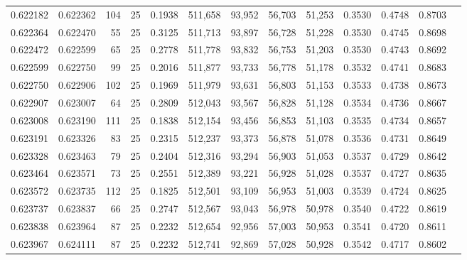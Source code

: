 \begin{tabular}{rrrrrrrrrrrrr}
0.622182 & 0.622362 &   104 &  25 &                                     0.1938 & 511,658 &  93,952 &  56,703 &  51,253 & 0.3530 & 0.4748 & 0.8703 \\
0.622364 & 0.622470 &    55 &  25 &                                     0.3125 & 511,713 &  93,897 &  56,728 &  51,228 & 0.3530 & 0.4745 & 0.8698 \\
0.622472 & 0.622599 &    65 &  25 &                                     0.2778 & 511,778 &  93,832 &  56,753 &  51,203 & 0.3530 & 0.4743 & 0.8692 \\
0.622599 & 0.622750 &    99 &  25 &                                     0.2016 & 511,877 &  93,733 &  56,778 &  51,178 & 0.3532 & 0.4741 & 0.8683 \\
0.622750 & 0.622906 &   102 &  25 &                                     0.1969 & 511,979 &  93,631 &  56,803 &  51,153 & 0.3533 & 0.4738 & 0.8673 \\
0.622907 & 0.623007 &    64 &  25 &                                     0.2809 & 512,043 &  93,567 &  56,828 &  51,128 & 0.3534 & 0.4736 & 0.8667 \\
0.623008 & 0.623190 &   111 &  25 &                                     0.1838 & 512,154 &  93,456 &  56,853 &  51,103 & 0.3535 & 0.4734 & 0.8657 \\
0.623191 & 0.623326 &    83 &  25 &                                     0.2315 & 512,237 &  93,373 &  56,878 &  51,078 & 0.3536 & 0.4731 & 0.8649 \\
0.623328 & 0.623463 &    79 &  25 &                                     0.2404 & 512,316 &  93,294 &  56,903 &  51,053 & 0.3537 & 0.4729 & 0.8642 \\
0.623464 & 0.623571 &    73 &  25 &                                     0.2551 & 512,389 &  93,221 &  56,928 &  51,028 & 0.3537 & 0.4727 & 0.8635 \\
0.623572 & 0.623735 &   112 &  25 &                                     0.1825 & 512,501 &  93,109 &  56,953 &  51,003 & 0.3539 & 0.4724 & 0.8625 \\
0.623737 & 0.623837 &    66 &  25 &                                     0.2747 & 512,567 &  93,043 &  56,978 &  50,978 & 0.3540 & 0.4722 & 0.8619 \\
0.623838 & 0.623964 &    87 &  25 &                                     0.2232 & 512,654 &  92,956 &  57,003 &  50,953 & 0.3541 & 0.4720 & 0.8611 \\
0.623967 & 0.624111 &    87 &  25 &                                     0.2232 & 512,741 &  92,869 &  57,028 &  50,928 & 0.3542 & 0.4717 & 0.8602 \\

\end{tabular}
